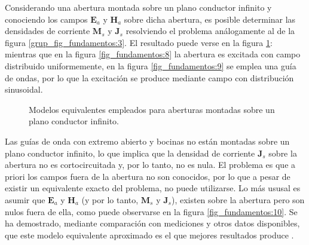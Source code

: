 Considerando una abertura montada sobre un plano conductor infinito y conociendo los campos $\mathbf{E}_a$ y $\mathbf{H}_a$ sobre dicha abertura, es posible determinar las densidades de corriente $\mathbf{M}_s$ y $\mathbf{J}_s$ resolviendo el problema análogamente al de la figura \ref{grup_fig_fundamentos:3}. El resultado puede verse en la figura \ref{grup_fig_fundamentos:4}: mientras que en la figura \ref{fig_fundamentos:8} la abertura es excitada con campo distribuido uniformemente, en la figura \ref{fig_fundamentos:9} se emplea una guía de ondas, por lo que la excitación se produce mediante campo con distribución sinusoidal.
\begin{figure} [H]
\centering 
{}
\caption{Modelos equivalentes empleados para aberturas montadas sobre un plano conductor infinito.}
\label{grup_fig_fundamentos:4}
\end{figure}
Las guías de onda con extremo abierto y bocinas no están montadas sobre un plano conductor infinito, lo que implica que la densidad de corriente $\mathbf{J}_s$ sobre la abertura no es cortocircuitada y, por lo tanto, no es nula. El problema es que a priori los campos fuera de la abertura no son conocidos, por lo que a pesar de existir un equivalente exacto del problema, no puede utilizarse. Lo más ususal es asumir que $\mathbf{E}_a$ y $\mathbf{H}_a$ (y por lo tanto, $\mathbf{M}_s$ y $\mathbf{J}_s$), existen sobre la abertura pero son nulos fuera de ella, como puede observarse en la figura \ref{fig_fundamentos:10}. Se ha demostrado, mediante comparación con mediciones y otros datos disponibles, que este modelo equivalente aproximado es el que mejores resultados produce \cite{Balanisantenas}.
